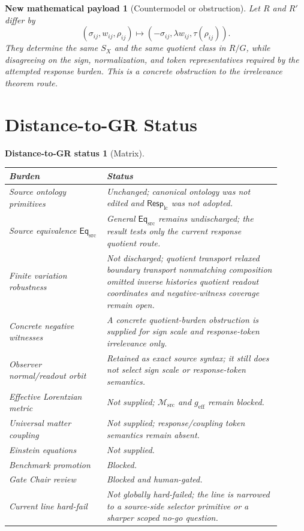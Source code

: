 \documentclass[11pt]{article}
\newcommand{\EqSrc}{\mathsf{Eq}_{\mathrm{src}}}
\newcommand{\Msrc}{\mathcal{M}_{\mathrm{src}}}
\newcommand{\RespLC}{\mathsf{Resp}_{\mathrm{lc}}}
\newcommand{\geff}{g_{\mathrm{eff}}}
\newtheorem{payload}{New mathematical payload}
\newtheorem{distancestatus}{Distance-to-GR status}
\begin{document}
\begin{payload}[Countermodel or obstruction]
Let \(R\) and \(R'\) differ by
\[
    (\sigma_{ij},w_{ij},\rho_{ij})
    \mapsto
    (-\sigma_{ij},\lambda w_{ij},\tau(\rho_{ij})).
\]
They determine the same \(S_X\) and the same quotient class in
\(R/G\), while disagreeing on the sign, normalization, and token
representatives required by the attempted response burden. This is a
concrete obstruction to the irrelevance theorem route.
\end{payload}

\section{Distance-to-GR Status}

\begin{distancestatus}[Matrix]
\begin{center}
\small
\begin{tabular}{p{0.32\linewidth}p{0.58\linewidth}}
\hline
\textbf{Burden} & \textbf{Status} \\
\hline
Source ontology primitives & Unchanged; canonical ontology was not edited and \(\RespLC\) was not adopted. \\
Source equivalence \(\EqSrc\) & General \(\EqSrc\) remains undischarged; the result tests only the current response quotient route. \\
Finite variation robustness & Not discharged; quotient transport relaxed boundary transport nonmatching composition omitted inverse histories quotient readout coordinates and negative-witness coverage remain open. \\
Concrete negative witnesses & A concrete quotient-burden obstruction is supplied for sign scale and response-token irrelevance only. \\
Observer normal/readout orbit & Retained as exact source syntax; it still does not select sign scale or response-token semantics. \\
Effective Lorentzian metric & Not supplied; \(\Msrc\) and \(\geff\) remain blocked. \\
Universal matter coupling & Not supplied; response/coupling token semantics remain absent. \\
Einstein equations & Not supplied. \\
Benchmark promotion & Blocked. \\
Gate Chair review & Blocked and human-gated. \\
Current line hard-fail & Not globally hard-failed; the line is narrowed to a source-side selector primitive or a sharper scoped no-go question. \\
\hline
\end{tabular}
\end{center}
\end{distancestatus}
\end{document}
